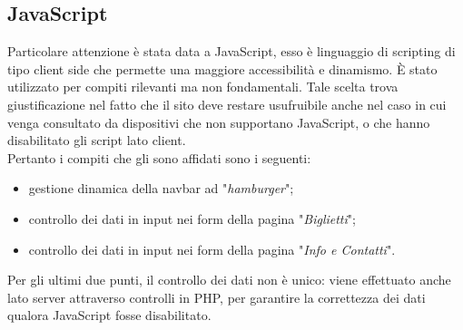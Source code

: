 \subsection{JavaScript}
	Particolare attenzione è stata data a JavaScript, esso è linguaggio di scripting di tipo client side che permette una
	maggiore accessibilità e dinamismo. \`E stato utilizzato per compiti rilevanti ma non fondamentali. Tale scelta trova giustificazione nel fatto che il sito deve restare usufruibile anche nel caso in cui venga consultato da dispositivi che non supportano JavaScript, o che hanno disabilitato gli script lato client.\\
	Pertanto i compiti che gli sono affidati sono i seguenti:
	\begin{itemize}
		\item gestione dinamica della navbar ad "\textit{hamburger}";
		\item controllo dei dati in input nei form della pagina "\textit{Biglietti}";
		\item controllo dei dati in input nei form della pagina "\textit{Info e Contatti}".
	\end{itemize}
	Per gli ultimi due punti, il controllo dei dati non è unico: viene effettuato anche lato server attraverso controlli in PHP, per garantire la correttezza dei dati qualora JavaScript fosse disabilitato.

